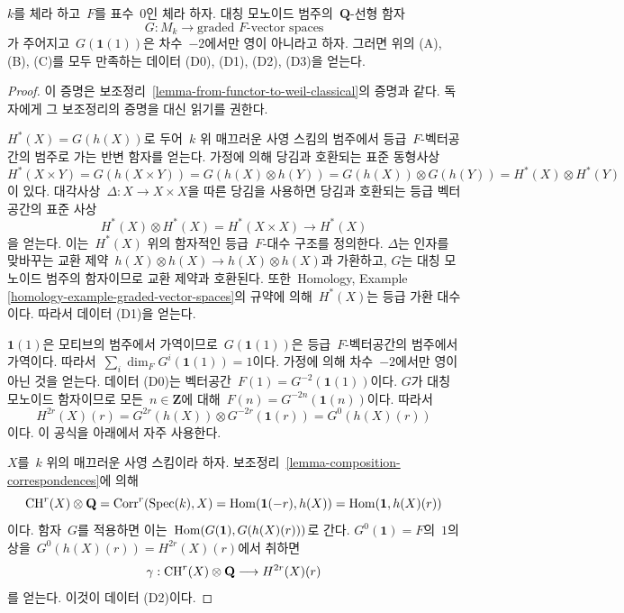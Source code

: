 \begin{lemma}
\label{lemma-from-functor-to-weil}
$k$를 체라 하고\  $F$를 표수\  $0$인 체라 하자. 대칭 모노이드 범주의\ 
$\mathbf{Q}$-선형 함자
$$
G : M_k \longrightarrow \text{graded }F\text{-vector spaces}
$$
가 주어지고\  $G(\mathbf{1}(1))$은 차수\  $-2$에서만 영이 아니라고 하자.
그러면 위의 (A), (B), (C)를 모두 만족하는 데이터 (D0), (D1), (D2),
(D3)을 얻는다.
\end{lemma}

\begin{proof}
이 증명은 보조정리\  \ref{lemma-from-functor-to-weil-classical}의 증명과
같다. 독자에게 그 보조정리의 증명을 대신 읽기를 권한다.

\medskip\noindent
$H^*(X) = G(h(X))$로 두어\  $k$ 위 매끄러운 사영 스킴의 범주에서
등급\  $F$-벡터공간의 범주로 가는 반변 함자를 얻는다. 가정에 의해
당김과 호환되는 표준 동형사상
$$
H^*(X \times Y) = G(h(X \times Y)) = G(h(X) \otimes h(Y)) =
G(h(X)) \otimes G(h(Y)) = H^*(X) \otimes H^*(Y)
$$
이 있다. 대각사상\  $\Delta : X \to X \times X$을 따른 당김을 사용하면
당김과 호환되는 등급 벡터공간의 표준 사상
$$
H^*(X) \otimes H^*(X) = H^*(X \times X) \to H^*(X)
$$
을 얻는다. 이는\  $H^*(X)$ 위의 함자적인 등급\  $F$-대수 구조를 정의한다.
$\Delta$는 인자를 맞바꾸는 교환 제약\ 
$h(X) \otimes h(X) \to h(X) \otimes h(X)$과 가환하고, $G$는 대칭
모노이드 범주의 함자이므로 교환 제약과 호환된다. 또한\  Homology,
Example \ref{homology-example-graded-vector-spaces}의 규약에 의해\ 
$H^*(X)$는 등급 가환 대수이다. 따라서 데이터 (D1)을 얻는다.

\medskip\noindent
$\mathbf{1}(1)$은 모티브의 범주에서 가역이므로\ 
$G(\mathbf{1}(1))$은 등급\  $F$-벡터공간의 범주에서 가역이다. 따라서\ 
$\sum_i \dim_F G^i(\mathbf{1}(1)) = 1$이다. 가정에 의해 차수\  $-2$에서만
영이 아닌 것을 얻는다. 데이터 (D0)는 벡터공간\ 
$F(1) = G^{-2}(\mathbf{1}(1))$이다. $G$가 대칭 모노이드 함자이므로 모든\ 
$n \in \mathbf{Z}$에 대해\  $F(n) = G^{-2n}(\mathbf{1}(n))$이다. 따라서
$$
H^{2r}(X)(r) = G^{2r}(h(X)) \otimes G^{-2r}(\mathbf{1}(r)) =
G^0(h(X)(r))
$$
이다. 이 공식을 아래에서 자주 사용한다.

\medskip\noindent
$X$를\  $k$ 위의 매끄러운 사영 스킴이라 하자. 보조정리\ 
\ref{lemma-composition-correspondences}에 의해
$$
\mathop{\mathrm{CH}}\nolimits^r(X) \otimes \mathbf{Q} = \text{Corr}^r(\mathop{\mathrm{Spec}}(k), X) =
\mathop{\mathrm{Hom}}\nolimits(\mathbf{1}(-r), h(X)) = \mathop{\mathrm{Hom}}\nolimits(\mathbf{1}, h(X)(r))
$$
이다. 함자\  $G$를 적용하면 이는\ 
$\mathop{\mathrm{Hom}}\nolimits(G(\mathbf{1}), G(h(X)(r)))$로 간다. $G^0(\mathbf{1}) = F$의\ 
$1$의 상을\  $G^0(h(X)(r)) = H^{2r}(X)(r)$에서 취하면
$$
\gamma :
\mathop{\mathrm{CH}}\nolimits^r(X) \otimes \mathbf{Q} \longrightarrow H^{2r}(X)(r)
$$
를 얻는다. 이것이 데이터 (D2)이다.


\end{proof}
